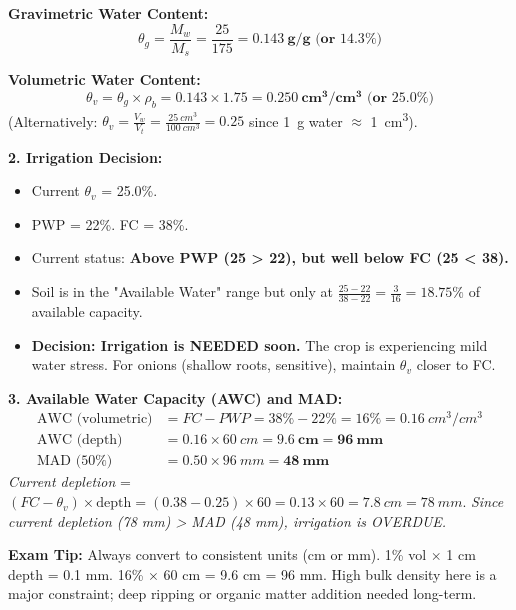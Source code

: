 \documentclass[11pt]{article}
\begin{document}
\begin{exoresolu}
\noindent\textbf{Gravimetric Water Content:}
\[
\theta_g = \frac{M_w}{M_s} = \frac{25}{175} = \mathbf{0.143\ g/g \text{ (or } 14.3\%)}
\]

\noindent\textbf{Volumetric Water Content:}
\[
\theta_v = \theta_g \times \rho_b = 0.143 \times 1.75 = \mathbf{0.250\ cm^3/cm^3 \text{ (or } 25.0\%)}
\]
(Alternatively: $\theta_v = \frac{V_w}{V_t} = \frac{25\ cm^3}{100\ cm^3} = 0.25$ since \SI{1}{g} water $\approx$ \SI{1}{cm^3}).

\noindent\textbf{2. Irrigation Decision:}
\begin{itemize}
\item Current $\theta_v$ = 25.0\%.
\item PWP = 22\%. FC = 38\%.
\item Current status: \textbf{Above PWP (25 > 22), but well below FC (25 < 38).}
\item Soil is in the "Available Water" range but only at $\frac{25-22}{38-22} = \frac{3}{16} = 18.75\%$ of available capacity.
\item \textbf{Decision: Irrigation is NEEDED soon.} The crop is experiencing mild water stress. For onions (shallow roots, sensitive), maintain $\theta_v$ closer to FC.
\end{itemize}

\noindent\textbf{3. Available Water Capacity (AWC) and MAD:}
\begin{align*}
\text{AWC (volumetric)} &= FC - PWP = 38\% - 22\% = 16\% = 0.16\ cm^3/cm^3 \\
\text{AWC (depth)} &= 0.16 \times \SI{60}{cm} = \mathbf{9.6\ cm = 96\ mm} \\
\text{MAD (50\%)} &= 0.50 \times 96\ mm = \mathbf{48\ mm}
\end{align*}
\textit{Current depletion} = $(FC - \theta_v) \times \text{depth} = (0.38 - 0.25) \times 60 = 0.13 \times 60 = \SI{7.8}{cm} = \SI{78}{mm}$.
\textit{Since current depletion (78 mm) > MAD (48 mm), irrigation is OVERDUE.}

\noindent\textbf{Exam Tip:} Always convert to consistent units (cm or mm). 1\% vol $\times$ 1 cm depth = 0.1 mm. 16\% $\times$ 60 cm = 9.6 cm = 96 mm. High bulk density here is a major constraint; deep ripping or organic matter addition needed long-term.
\end{exoresolu}
\end{document}
